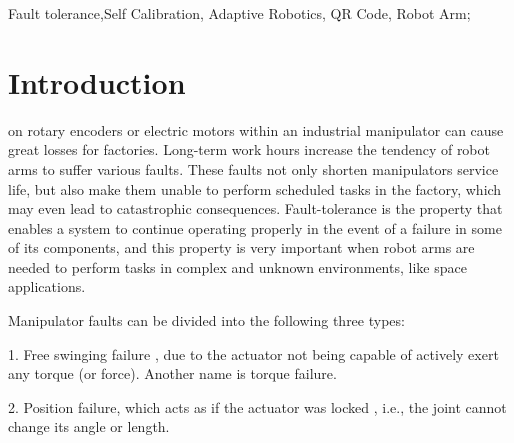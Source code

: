 \documentclass{ieeeaccess}
\begin{document}
\begin{keywords}
Fault tolerance,Self Calibration, Adaptive Robotics, QR Code, Robot Arm;
\end{keywords}

\titlepgskip=-15pt

\maketitle

\section{Introduction}
\label{sec:introduction}
 on rotary encoders or electric motors within an industrial manipulator can cause great losses for factories. 
Long-term work hours increase the tendency of robot arms to suffer various faults.
These faults not only shorten manipulators service life, but also make them unable to perform scheduled tasks in the factory, which may even lead to catastrophic consequences. 
Fault-tolerance is the property that enables a system to continue operating properly in the event of a failure in some of its components, and this property is very important when robot arms are needed to perform tasks in complex and unknown environments, like space applications.


Manipulator faults can be divided into the following three types:

1. Free swinging failure \cite{english1998fault,english2000measuring},  due to the actuator not being capable of actively exert any torque (or force). Another name is torque failure. 

2. Position failure, which acts as if the actuator was locked \cite{maciejewski1990fault,paredis1994kinematic,roberts1996local}, i.e., the joint cannot change its angle or length.
\end{document}
